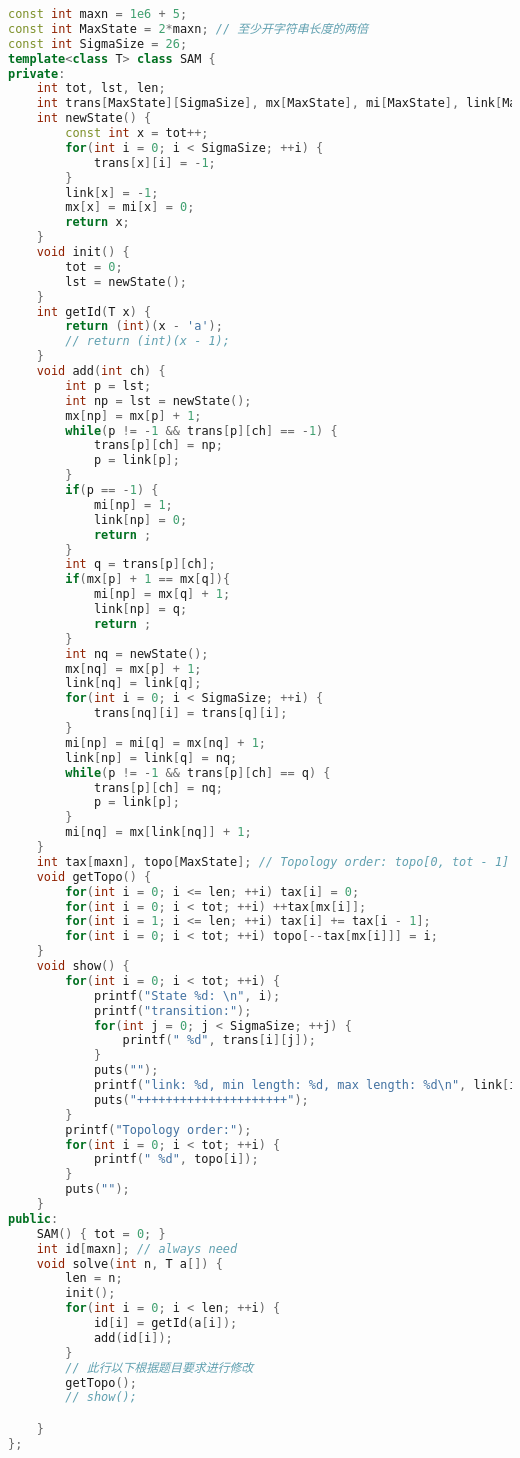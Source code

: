 \begin{lstlisting}[language=C++]
const int maxn = 1e6 + 5;
const int MaxState = 2*maxn; // 至少开字符串长度的两倍
const int SigmaSize = 26;
template<class T> class SAM {
private:
    int tot, lst, len;
    int trans[MaxState][SigmaSize], mx[MaxState], mi[MaxState], link[MaxState];
    int newState() {
        const int x = tot++;
        for(int i = 0; i < SigmaSize; ++i) {
            trans[x][i] = -1;
        }
        link[x] = -1;
        mx[x] = mi[x] = 0;
        return x;
    }
    void init() {
        tot = 0;
        lst = newState();
    }
    int getId(T x) {
        return (int)(x - 'a');
        // return (int)(x - 1);
    }
    void add(int ch) {
        int p = lst;
        int np = lst = newState();
        mx[np] = mx[p] + 1;
        while(p != -1 && trans[p][ch] == -1) {
            trans[p][ch] = np;
            p = link[p];
        }
        if(p == -1) {
            mi[np] = 1;
            link[np] = 0;
            return ;
        }
        int q = trans[p][ch];
        if(mx[p] + 1 == mx[q]){
            mi[np] = mx[q] + 1;
            link[np] = q;
            return ;
        }
        int nq = newState();
        mx[nq] = mx[p] + 1;
        link[nq] = link[q];
        for(int i = 0; i < SigmaSize; ++i) {
            trans[nq][i] = trans[q][i];
        }
        mi[np] = mi[q] = mx[nq] + 1;
        link[np] = link[q] = nq;
        while(p != -1 && trans[p][ch] == q) {
            trans[p][ch] = nq;
            p = link[p];
        }
        mi[nq] = mx[link[nq]] + 1;
    }
    int tax[maxn], topo[MaxState]; // Topology order: topo[0, tot - 1]
    void getTopo() {
        for(int i = 0; i <= len; ++i) tax[i] = 0;
        for(int i = 0; i < tot; ++i) ++tax[mx[i]];
        for(int i = 1; i <= len; ++i) tax[i] += tax[i - 1];
        for(int i = 0; i < tot; ++i) topo[--tax[mx[i]]] = i;
    }
    void show() {
        for(int i = 0; i < tot; ++i) {
            printf("State %d: \n", i);
            printf("transition:");
            for(int j = 0; j < SigmaSize; ++j) {
                printf(" %d", trans[i][j]);
            }
            puts("");
            printf("link: %d, min length: %d, max length: %d\n", link[i], mi[i], mx[i]);
            puts("+++++++++++++++++++++");
        }
        printf("Topology order:");
        for(int i = 0; i < tot; ++i) {
            printf(" %d", topo[i]);
        }
        puts("");
    }
public:
    SAM() { tot = 0; }
    int id[maxn]; // always need
    void solve(int n, T a[]) {
        len = n;
        init();
        for(int i = 0; i < len; ++i) {
            id[i] = getId(a[i]);
            add(id[i]);
        }
        // 此行以下根据题目要求进行修改
        getTopo();
        // show();

    }
};
\end{lstlisting}

